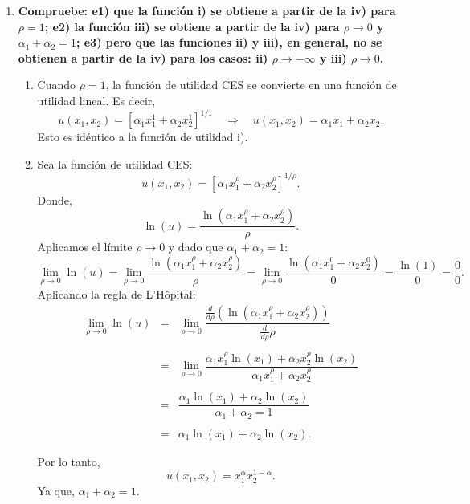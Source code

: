 \begin{enumerate}
\begin{enumerate}[\bfseries a)]
	    \item \textbf{\boldmath Compruebe: e1) que la función i) se obtiene a partir de la iv) para $\rho = 1$; e2) la función iii) se obtiene a partir de la iv) para $\rho \to 0$ y $\alpha_1 + \alpha_2 = 1$; e3) pero que las funciones ii) y iii), en general, no se obtienen a partir de la iv) para los casos: ii) $\rho \to -\infty$ y iii) $\rho \to 0$.}\\

	    \begin{enumerate}[e1)]

		\item 

		Cuando $\rho = 1$, la función de utilidad CES se convierte en una función de utilidad lineal. Es decir, 
		$$u(x_1,x_2)=\left[\alpha_1 x_1^{1}+\alpha_2 x_2^{1}\right]^{1/1} \quad \Rightarrow \quad u(x_1,x_2)=\alpha_1 x_1+\alpha_2 x_2.$$ 
		Esto es idéntico a la función de utilidad i).\\

		\item 

		Sea la función de utilidad CES:
		$$u(x_1,x_2)=\left[\alpha_1 x_1^{\rho}+\alpha_2 x_2^{\rho}\right]^{1/\rho}.$$
		Donde,
		$$\ln(u)=\dfrac{\ln(\alpha_1 x_1^{\rho}+\alpha_2 x_2^{\rho})}{\rho}.$$
		Aplicamos el límite $\rho \to 0$ y dado que $\alpha_1 + \alpha_2 = 1$:
		$$\lim_{\rho\to 0}\ln(u)=\lim_{\rho\to 0}\dfrac{\ln(\alpha_1 x_1^{\rho}+\alpha_2 x_2^{\rho})}{\rho}=\lim_{\rho\to 0}\dfrac{\ln(\alpha_1 x_1^{0}+\alpha_2 x_2^{0})}{0}=\dfrac{\ln(1)}{0}=\dfrac{0}{0}.$$
		Aplicando la regla de L'Hôpital:
		$$
		\begin{array}{rcl}
		    \displaystyle\lim_{\rho\to 0} \ln(u)&=&\displaystyle\lim_{\rho\to 0} \dfrac{\frac{d}{d\rho}(\ln(\alpha_1 x_1^{\rho}+\alpha_2 x_2^{\rho}))}{\frac{d}{d\rho}\rho}\\\\
					   &=&\displaystyle\lim_{\rho\to 0} \dfrac{\alpha_1 x_1^{\rho}\ln(x_1)+\alpha_2 x_2^{\rho}\ln(x_2)}{\alpha_1 x_1^{\rho}+\alpha_2 x_2^{\rho}}\\\\
					   &=&\dfrac{\alpha_1 \ln(x_1)+\alpha_2 \ln(x_2)}{\alpha_1 +\alpha_2=1}\\\\
					   &=&\alpha_1 \ln(x_1)+\alpha_2 \ln(x_2).
		\end{array}
		$$

		Por lo tanto,
		$$u(x_1,x_2)=x_1^{\alpha}x_2^{1-\alpha}.$$
		Ya que, $\alpha_1 + \alpha_2 = 1$.\\\\



\end{enumerate}
\end{enumerate}
\end{enumerate}
